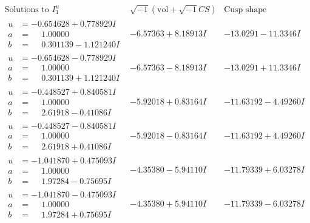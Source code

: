 \documentclass[1p]{elsarticle_modified}
\theoremstyle{definition}
\newcommand{\I}{\sqrt{-1}}
\begin{document}
$$\begin{array}{c|c|c}  
\text{Solutions to }I^u_{1}& \I (\text{vol} + \sqrt{-1}CS) & \text{Cusp shape}\\
 \hline 
\begin{aligned}
u &= -0.654628 + 0.778929 I \\
a &= \phantom{-}1.00000\phantom{ +0.000000I} \\
b &= \phantom{-}0.301139 - 1.121240 I\end{aligned}
 & -6.57363 + 8.18913 I & -13.0291 - 11.3346 I \\ \hline\begin{aligned}
u &= -0.654628 - 0.778929 I \\
a &= \phantom{-}1.00000\phantom{ +0.000000I} \\
b &= \phantom{-}0.301139 + 1.121240 I\end{aligned}
 & -6.57363 - 8.18913 I & -13.0291 + 11.3346 I \\ \hline\begin{aligned}
u &= -0.448527 + 0.840581 I \\
a &= \phantom{-}1.00000\phantom{ +0.000000I} \\
b &= \phantom{-}2.61918 - 0.41086 I\end{aligned}
 & -5.92018 + 0.83164 I & -11.63192 - 4.49260 I \\ \hline\begin{aligned}
u &= -0.448527 - 0.840581 I \\
a &= \phantom{-}1.00000\phantom{ +0.000000I} \\
b &= \phantom{-}2.61918 + 0.41086 I\end{aligned}
 & -5.92018 - 0.83164 I & -11.63192 + 4.49260 I \\ \hline\begin{aligned}
u &= -1.041870 + 0.475093 I \\
a &= \phantom{-}1.00000\phantom{ +0.000000I} \\
b &= \phantom{-}1.97284 - 0.75695 I\end{aligned}
 & -4.35380 - 5.94110 I & -11.79339 + 6.03278 I \\ \hline\begin{aligned}
u &= -1.041870 - 0.475093 I \\
a &= \phantom{-}1.00000\phantom{ +0.000000I} \\
b &= \phantom{-}1.97284 + 0.75695 I\end{aligned}
 & -4.35380 + 5.94110 I & -11.79339 - 6.03278 I \\ \hline\begin{aligned}

\end{aligned}
\end{array}$$
\end{document}
